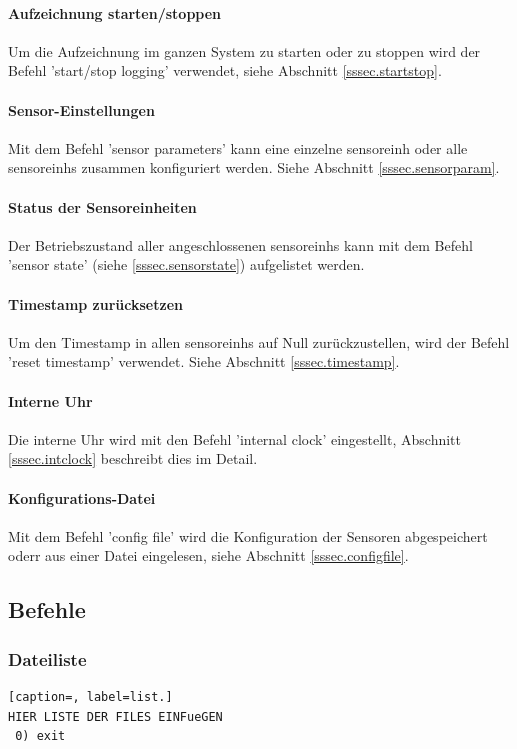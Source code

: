 \paragraph{Aufzeichnung starten/stoppen} Um die Aufzeichnung im ganzen System zu starten oder zu stoppen wird der Befehl 'start/stop logging' verwendet, siehe Abschnitt \ref{sssec.startstop}.

\paragraph{Sensor-Einstellungen} Mit dem Befehl 'sensor parameters' kann eine einzelne \gls{sensoreinh} oder alle \glspl{sensoreinh} zusammen konfiguriert werden. Siehe Abschnitt \ref{sssec.sensorparam}.

\paragraph{Status der Sensoreinheiten} Der Betriebszustand aller angeschlossenen \glspl{sensoreinh} kann mit dem Befehl 'sensor state' (siehe \ref{sssec.sensorstate}) aufgelistet werden.

\paragraph{Timestamp zurücksetzen} Um den Timestamp in allen \glspl{sensoreinh} auf Null zurückzustellen, wird der Befehl 'reset timestamp' verwendet. Siehe Abschnitt \ref{sssec.timestamp}.

\paragraph{Interne Uhr} Die interne Uhr wird mit den Befehl 'internal clock' eingestellt, Abschnitt \ref{sssec.intclock} beschreibt dies im Detail.

\paragraph{Konfigurations-Datei} Mit dem Befehl 'config file' wird die Konfiguration der Sensoren abgespeichert oderr aus einer Datei eingelesen, siehe Abschnitt \ref{sssec.configfile}.

\subsection{Befehle}\label{ssec.befehle}

\subsubsection{Dateiliste}\label{ssec.listfiles}
\begin{lstlisting}[caption=, label=list.]
HIER LISTE DER FILES EINFueGEN
 0) exit
\end{lstlisting}


